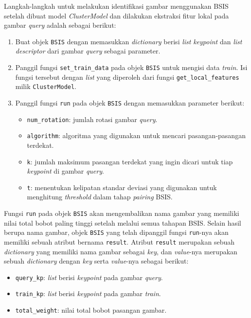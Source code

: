 Langkah-langkah untuk melakukan identifikasi gambar menggunakan BSIS setelah dibuat model \textit{ClusterModel} dan dilakukan ekstraksi fitur lokal pada gambar \textit{query} adalah sebagai berikut:
\begin{enumerate}
	\item Buat objek \texttt{BSIS} dengan memasukkan \textit{dictionary} berisi \textit{list} \textit{keypoint} dan \textit{list} \textit{descriptor} dari gambar \textit{query} sebagai parameter.
	\item Panggil fungsi \texttt{set\_train\_data} pada objek \texttt{BSIS} untuk mengisi data \textit{train}. Isi fungsi tersebut dengan \textit{list} yang diperoleh dari fungsi \texttt{get\_local\_features} milik \texttt{ClusterModel}.
	\item Panggil fungsi \texttt{run} pada objek \texttt{BSIS} dengan memasukkan parameter berikut:
	\begin{itemize}
		\item \texttt{num\_rotation}: jumlah rotasi gambar \textit{query}.
		\item \texttt{algorithm}: algoritma yang digunakan untuk mencari pasangan-pasangan terdekat.
		\item \texttt{k}: jumlah maksimum pasangan terdekat yang ingin dicari untuk tiap \textit{keypoint} di gambar \textit{query}.
		\item \texttt{t}: menentukan kelipatan standar deviasi yang digunakan untuk menghitung \textit{threshold} dalam tahap \textit{pairing} BSIS.
	\end{itemize}
\end{enumerate} 
Fungsi \texttt{run} pada objek \texttt{BSIS} akan mengembalikan nama gambar yang memiliki nilai total bobot paling tinggi setelah melalui semua tahapan BSIS. Selain hasil berupa nama gambar, objek \texttt{BSIS} yang telah dipanggil fungsi \texttt{run}-nya akan memiliki sebuah atribut bernama \texttt{result}. Atribut \texttt{result} merupakan sebuah \textit{dictionary} yang memiliki nama gambar sebagai \textit{key}, dan \textit{value}-nya merupakan sebuah \textit{dictionary} dengan \textit{key} serta \textit{value}-nya sebagai berikut:
\begin{itemize}
	\item \texttt{query\_kp}: \textit{list} berisi \textit{keypoint} pada gambar \textit{query}.
	\item \texttt{train\_kp}: \textit{list} berisi \textit{keypoint} pada gambar \textit{train}.
	\item \texttt{total\_weight}: nilai total bobot pasangan gambar.
\end{itemize}  

